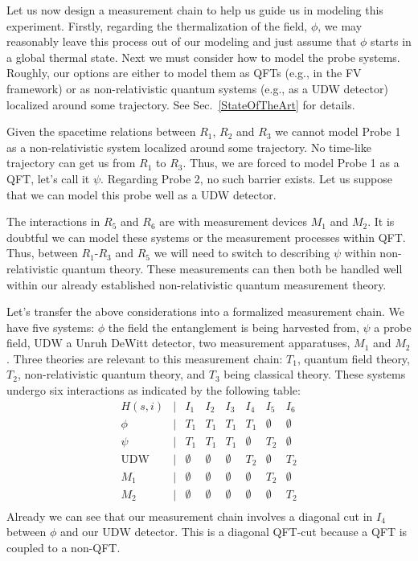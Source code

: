 \documentclass[12pt,prd,superscriptaddress,floatfix,amsmath,amssymb,amsfonts,nofootinbib]{revtex4-2}
\begin{document}
Let us now design a measurement chain to help us guide us in modeling this experiment. Firstly, regarding the thermalization of the field, $\phi$, we may reasonably leave this process out of our modeling and just assume that $\phi$ starts in a global thermal state. Next we must consider how to model the probe systems. Roughly, our options are either to model them as QFTs (e.g., in the FV framework) or as non-relativistic quantum systems (e.g., as a UDW detector) localized around some trajectory. See Sec.~\ref{StateOfTheArt} for details.

Given the spacetime relations between $R_1$, $R_2$ and $R_3$ we cannot model Probe 1 as a non-relativistic system localized around some trajectory. No time-like trajectory can get us from $R_1$ to $R_3$. Thus, we are forced to model Probe 1 as a QFT, let's call it $\psi$. Regarding Probe 2, no such barrier exists. Let us suppose that we can model this probe well as a UDW detector. 

The interactions in $R_5$ and $R_6$ are with measurement devices $M_1$ and $M_2$. It is doubtful we can model these systems or the measurement processes within QFT. Thus, between $R_1$-$R_3$ and $R_5$ we will need to switch to describing $\psi$ within non-relativistic quantum theory. These measurements can then both be handled well within our already established non-relativistic quantum measurement theory. 

Let's transfer the above considerations into a formalized measurement chain. We have five systems: $\phi$ the field the entanglement is being harvested from, $\psi$ a probe field, $\text{UDW}$ a Unruh DeWitt detector, two measurement apparatuses, $M_1$ and $M_2$. Three theories are relevant to this measurement chain: $T_1$, quantum field theory, $T_2$, non-relativistic quantum theory, and $T_3$ being classical theory. These systems undergo six interactions as indicated by the following table:
\[\begin{array}{cccccccc}
H(s,i) & \vert & I_1 & I_2 & I_3 & I_4 & I_5 & I_6\\
\phi & \vert & T_1 & T_1 & T_1 & T_1 & \emptyset & \emptyset\\
\psi & \vert & T_1 & T_1 & T_1 & \emptyset & T_2 & \emptyset\\
\text{UDW} & \vert & \emptyset & \emptyset & \emptyset & T_2 & \emptyset & T_2\\
M_1 & \vert & \emptyset & \emptyset & \emptyset & \emptyset & T_2 & \emptyset\\
M_2 & \vert & \emptyset & \emptyset & \emptyset & \emptyset & \emptyset & T_2\\
\end{array}\]
Already we can see that our measurement chain involves a diagonal cut in $I_4$ between $\phi$ and our $\text{UDW}$ detector. This is a diagonal QFT-cut because a QFT is coupled to a non-QFT.
\end{document}
